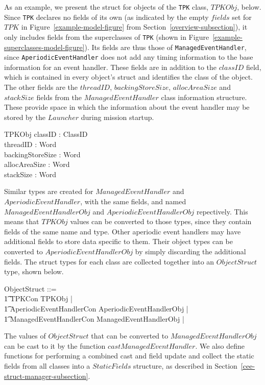 As an example, we present the struct for objects of the \texttt{TPK}
class, $TPKObj$, below.
Since \texttt{TPK} declares no fields of its own (as indicated by the
empty $fields$ set for $TPK$ in Figure~\ref{example-model-figure} from
Section~\ref{overview-subsection}), it only includes fields from the
superclasses of \texttt{TPK} (shown in
Figure~\ref{example-superclasses-model-figure}).
Its fields are thus those of \texttt{ManagedEventHandler}, since
\texttt{AperiodicEventHandler} does not add any timing information to
the base information for an event handler.
These fields are in addition to the $classID$ field, which is
contained in every object's struct and identifies the class of the
object.
The other fields are the $threadID$, $backingStoreSize$,
$allocAreaSize$ and $stackSize$ fields from the $ManagedEventHandler$
class information structure.
These provide space in which the information about the event handler
may be stored by the $Launcher$ during mission startup.
\begin{schema}{TPKObj}
  classID : ClassID \\
  threadID : Word \\
  backingStoreSize : Word \\
  allocAreaSize : Word \\
  stackSize : Word
\end{schema}

Similar types are created for $ManagedEventHandler$ and
$AperiodicEventHandler$, with the same fields, and named
$ManagedEventHandlerObj$ and $AperiodicEventHandlerObj$ repectively.
This means that $TPKObj$ values can be converted to those types, since
they contain fields of the same name and type.
Other aperiodic event handlers may have additional fields to store
data specific to them.
Their object types can be converted to $AperiodicEventHandlerObj$ by
simply discarding the additional fields.
The struct types for each class are collected together into an
$ObjectStruct$ type, shown below.
\begin{zed}
  ObjectStruct ::= \\
  \t1 TPKCon \ldata TPKObj \rdata | \\
  \t1 AperiodicEventHandlerCon \ldata AperiodicEventHandlerObj \rdata | \\
  \t1 ManagedEventHandlerCon \ldata ManagedEventHandlerObj \rdata | \cdots {} 
\end{zed}

The values of $ObjectStruct$ that can be converted to
$ManagedEventHandlerObj$ can be cast to it by the function
$castManagedEventHandler$.
We also define functions for performing a combined cast and field
update and collect the static fields from all classes into a
$StaticFields$ structure, as described in
Section~\ref{cee-struct-manager-subsection}.

